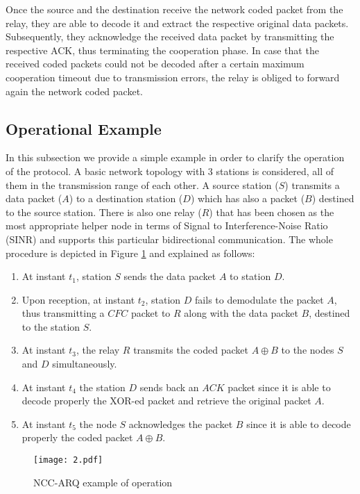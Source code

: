 \documentclass[conference]{IEEEtran}
\begin{document}
Once the source and the destination receive the network coded packet from the relay, they are able to decode it and extract the respective original data packets. Subsequently, they acknowledge the received data packet by transmitting the respective ACK, thus terminating the cooperation phase. In case that the received coded packets could not be decoded  after a certain maximum cooperation timeout due to transmission errors, the relay is obliged to forward again the network coded packet.


\subsection{Operational Example}

In this subsection we provide a simple example in order to clarify the operation of the protocol. A basic network topology with 3 stations is considered, all of them in the transmission range of each other. A source station ($S$) transmits a data packet ($A$) to a destination station ($D$) which has also a packet ($B$) destined to the source station. There is also one relay ($R$) that has been chosen as the most appropriate helper node in terms of Signal to Interference-Noise Ratio (SINR) and supports this particular bidirectional communication. The whole procedure is depicted in Figure \ref{f2} and explained as follows:
\begin{enumerate}
\item At instant $t_{1}$, station $S$ sends the data packet $A$ to station $D$.
\item Upon reception, at instant $t_{2}$, station $D$ fails to demodulate the packet $A$, thus transmitting a $CFC$ packet to $R$ along with the data packet $B$, destined to the station $S$.
\item At instant $t_{3}$, the relay $R$  transmits the coded packet $A \oplus B$ to the nodes $S$ and $D$ simultaneously.
\item At instant $t_{4}$  the station $D$ sends back an $ACK$ packet since it is able to decode properly the XOR-ed packet and retrieve the original packet $A$.
\item At instant $t_{5}$  the node $S$ acknowledges the packet $B$ since it is able to decode properly the coded packet $A\oplus B$.
\end{enumerate}

\begin{figure}[htb]
\centering
\texttt{[image: 2.pdf]}
\caption{NCC-ARQ example of operation}\label{f2}
\end{figure}
\end{document}

